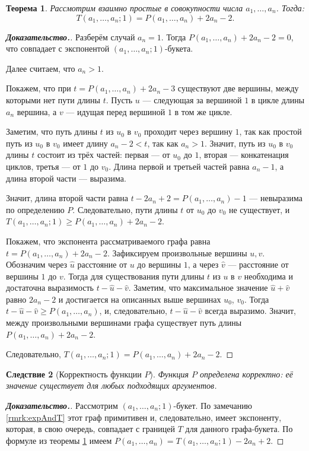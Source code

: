 \documentclass[12pt]{article}
\newtheorem{theorem}{Теорема}[section]
\newtheorem{corollary}[theorem]{Следствие}
\begin{document}
\begin{theorem}
\label{thTP}
Рассмотрим взаимно простые в совокупности числа $a_1, \dots, a_n$. Тогда: 
\begin{equation*}
T(a_1, \dots, a_n; 1) = P(a_1, \dots, a_n) + 2a_n - 2.
\end{equation*}
\end{theorem}
\begin{proof}[\textbf{Доказательство.}]
Разберём случай $a_n = 1$. Тогда $P(a_1, \dots, a_n) + 2a_n - 2 = 0$, что совпадает с экспонентой $(a_1, \dots, a_n; 1)$-букета.

Далее считаем, что $a_n > 1$.

Покажем, что при $t = P(a_1, \dots, a_n) + 2a_n - 3$ существуют две вершины, между которыми нет пути длины $t$. Пусть $u$ --- следующая за вершиной $1$ в цикле длины $a_n$ вершина, а $v$ --- идущая перед вершиной $1$ в том же цикле.

Заметим, что путь длины $t$ из $u_0$ в $v_0$ проходит через вершину $1$, так как простой путь из $u_0$ в $v_0$ имеет длину $a_n - 2 < t$, так как $a_n > 1$. Значит, путь из $u_0$ в $v_0$ длины $t$ состоит из трёх частей: первая --- от $u_0$ до $1$, вторая --- конкатенация циклов, третья --- от $1$ до $v_0$. Длина первой и третьей частей равна $a_n - 1$, а длина второй части --- выразима. 

Значит, длина второй части равна $t - 2a_n + 2 = P(a_1, \dots, a_n) - 1$ --- невыразима по определению $P$. Следовательно, пути длины $t$ от $u_0$ до $v_0$ не существует, и $T(a_1, \dots, a_n; 1) \ge P(a_1, \dots, a_n) + 2a_n - 2$.

Покажем, что экспонента рассматриваемого графа равна $t = P(a_1, \dots, a_n) + 2a_n - 2$. Зафиксируем произвольные вершины $u, v$. Обозначим через $\hat{u}$ расстояние от $u$ до вершины $1$, а через $\hat{v}$ --- расстояние от вершины $1$ до $v$. Тогда для существования пути длины $t$ из $u$ в $v$ необходима и достаточна выразимость $t - \hat{u} - \hat{v}$. Заметим, что максимальное значение $\hat{u} + \hat{v}$ равно $2a_n - 2$ и достигается на описанных выше вершинах $u_0$, $v_0$. Тогда $t - \hat{u} - \hat{v} \ge P(a_1, \dots, a_n)$, и, следовательно, $t - \hat{u} - \hat{v}$ всегда выразимо. Значит, между произвольными вершинами графа существует путь длины $P(a_1, \dots, a_n) + 2a_n - 2$.

Следовательно, $T(a_1, \dots, a_n; 1) = P(a_1, \dots, a_n) + 2a_n - 2$.
\end{proof}

\begin{corollary}[Корректность функции $P$]
Функция $P$ определена корректно: её значение существует для любых подходящих аргументов.
\end{corollary}
\begin{proof}[\textbf{Доказательство.}]
Рассмотрим $(a_1, \dots, a_n; 1)$-букет. По замечанию \ref{rmrk:expAndT} этот граф примитивен и, следовательно, имеет экспоненту, которая, в свою очередь, совпадает с границей $T$ для данного графа-букета. По формуле из теоремы \ref{thTP} имеем $P(a_1, \dots, a_n) = T(a_1, \dots, a_n; 1) - 2a_n + 2$.
\end{proof}
\end{document}
